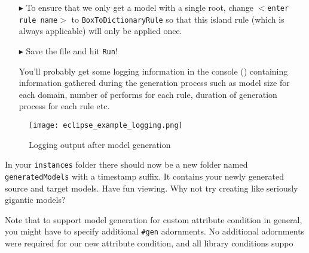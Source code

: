 \begin{itemize}

\item[$\blacktriangleright$]  To ensure that we only get a model with a single root, change \texttt{$<$enter rule name$>$} to \texttt{BoxToDictionaryRule} so that this island rule (which is always applicable) will only be applied once.

\item[$\blacktriangleright$] Save the file and hit \texttt{Run}!

You'll probably get some logging information in the console () containing information gathered during the generation process such as model size for each domain, number of performs for each rule, duration of generation process for each rule etc.

\end{itemize}


\begin{figure}[htbp]
\renewcommand\figurename{Figure} 
\begin{center}
\texttt{[image: eclipse\_example\_logging.png]}
\caption{Logging output after model generation}
\label{eclipse:modelgen_log}
\end{center}
\end{figure}

In your \texttt{instances} folder there should now be a new folder named \texttt{generated\-Models} with a timestamp suffix. 
It contains your newly generated source and target models.
Have fun viewing.
Why not try creating like seriously gigantic models?

Note that to support model generation for custom attribute condition in general, you might have to specify additional \texttt{\#gen} adornments. 
No additional adornments were required for our new attribute condition, and all library conditions suppo

